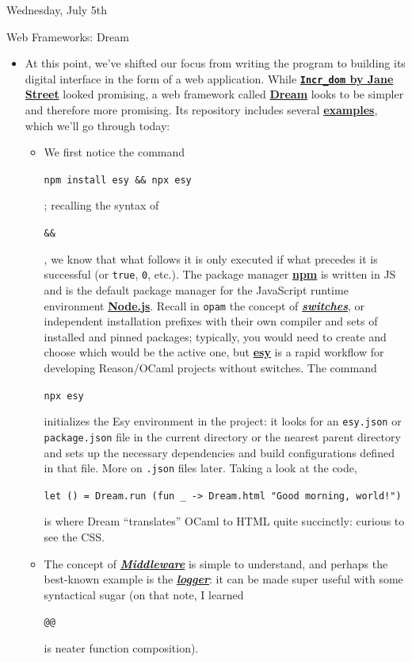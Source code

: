 \documentclass[11pt]{article}
\newcommand\codebox[1]{
    \noindent\hspace{-0.25em}\begin{tcolorbox}[on line, hbox, colback = codeblack, colframe = codeborder, coltext = white, boxrule = 1.5pt, left = 2pt, right = 2pt, top = 0.5pt, bottom = 0.5pt]
    \small\texttt{#1}\normalsize
    \end{tcolorbox}\hspace{-0.25em}
}
\begin{document}
\begin{hulkgreenbox}{Wednesday, July 5th\vspace{-2.2em}\begin{flushright}Web Frameworks: Dream \end{flushright}}
    \begin{itemize}
        \item At this point, we've shifted our focus from writing the program to building its digital interface in the form of a web application. While \href{https://opensource.janestreet.com/incr_dom/}{\textbf{\texttt{Incr\_dom} by Jane Street}} looked promising, a web framework called \href{https://aantron.github.io/dream/}{\textbf{Dream}} looks to be simpler and therefore more promising. Its repository includes several \href{https://github.com/aantron/dream/tree/master/example}{\textbf{examples}}, which we'll go through today:
        \begin{itemize}
            \item\href{https://github.com/aantron/dream/tree/master/example/1-hello}{} We first notice the command \codebox{npm install esy \&\& npx esy}; recalling the syntax of \codebox{\&\&}, we know that what follows it is only executed if what precedes it is successful (or \texttt{true}, \texttt{0}, etc.). The package manager \href{https://www.npmjs.com/}{\textbf{npm}} is written in JS and is the default package manager for the JavaScript runtime environment \href{https://nodejs.org/en}{\textbf{Node.js}}. Recall in \texttt{opam} the concept of \href{https://opam.ocaml.org/doc/man/opam-switch.html}{\textbf{\textit{switches}}}, or independent installation prefixes with their own compiler and sets of installed and pinned packages; typically, you would need to create and choose which would be the active one, but \href{https://esy.sh/docs/en/what-why.html}{\textbf{esy}} is a rapid workflow for developing Reason/OCaml projects without switches. The command \codebox{npx esy} initializes the Esy environment in the project: it looks for an \texttt{esy.json} or \texttt{package.json} file in the current directory or the nearest parent directory and sets up the necessary dependencies and build configurations defined in that file. More on \texttt{.json} files later. Taking a look at the code, \codebox{let () = Dream.run (fun \_ -> Dream.html "Good morning, world!")} is where Dream ``translates'' OCaml to HTML quite succinctly: curious to see the CSS.

            \item\href{https://github.com/aantron/dream/tree/master/example/2-middleware}{} The concept of \href{https://www.redhat.com/en/topics/middleware/what-is-middleware}{\textbf{\textit{Middleware}}} is simple to understand, and perhaps the best-known example is the \href{https://ocaml.org/p/dream/1.0.0~alpha4/doc/Dream/index.html#logging}{\textbf{\textit{logger}}}: it can be made super useful with some syntactical sugar (on that note, I learned \codebox{@@} is neater function composition).


\end{itemize}
\end{itemize}
\end{hulkgreenbox}
\end{document}
